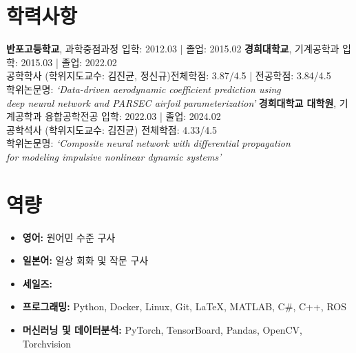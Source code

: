 \documentclass[a4paper,10pt]{extarticle}
\begin{document}
\section*{학력사항}
\noindent
\textbf{반포고등학교}, 과학중점과정 \hfill 입학: 2012.03 | 졸업: 2015.02
\newline
\textbf{경희대학교}, 기계공학과 \hfill 입학: 2015.03 | 졸업: 2022.02\\ %
공학학사 (학위지도교수: 김진균, 정신규)\hfill 전체학점: 3.87/4.5 | 전공학점: 3.84/4.5\\ %
학위논문명: \textit{\small{`Data-driven aerodynamic coefficient prediction using}}\\
\hspace*{1.9cm}\textit{\small{deep neural
        network and PARSEC airfoil parameterization'}}
\newline
\textbf{경희대학교 대학원}, 기계공학과 융합공학전공 \hfill 입학: 2022.03 | 졸업: 2024.02\\ %
공학석사 (학위지도교수: 김진균) \hfill 전체학점: 4.33/4.5\\ %
학위논문명: \textit{\small{`Composite neural network with differential propagation}}\\
\hspace*{1.9cm}\textit{\small{for modeling impulsive nonlinear dynamic systems'}}

\section*{역량}
\begin{itemize}
    \item \textbf{영어: }원어민 수준 구사
    \item \textbf{일본어: }일상 회화 및 작문 구사
    \item \textbf{세일즈: }
    \item \textbf{프로그래밍: }Python, Docker, Linux, Git, \LaTeX, MATLAB, C\#, C++, ROS
    \item \textbf{머신러닝 및 데이터분석:} PyTorch, TensorBoard, Pandas, OpenCV, Torchvision
\end{itemize}

\end{document}
